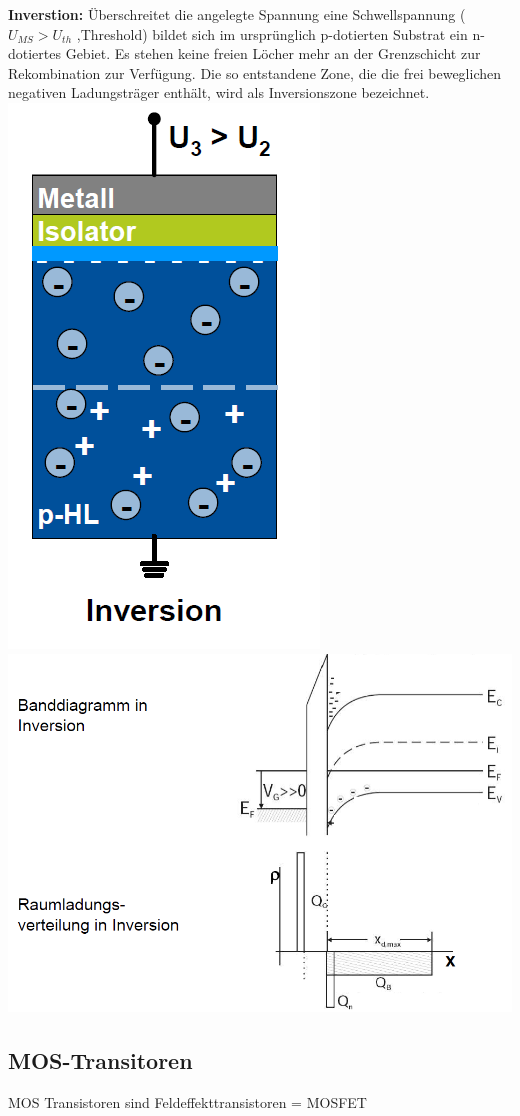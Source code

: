 		\textbf{Inverstion:}
		\newline
		Überschreitet die angelegte Spannung eine Schwellspannung ($U_{MS} > U_{th}$ ,Threshold) bildet sich im ursprünglich p-dotierten Substrat ein n-dotiertes Gebiet. Es stehen keine freien Löcher mehr an der Grenzschicht zur Rekombination zur Verfügung.
		\newline
		Die so entstandene Zone, die die frei beweglichen negativen Ladungsträger enthält, wird als Inversionszone 	bezeichnet.
		\newline
		\includegraphics[width=0.25\linewidth]{Kapitel/Kap06/Inverstion1}		
		\includegraphics[width=0.60\linewidth]{Kapitel/Kap06/Inversion2}
		
		
\subsection{MOS-Transitoren}
MOS Transistoren sind Feldeffekttransistoren =
MOSFET
